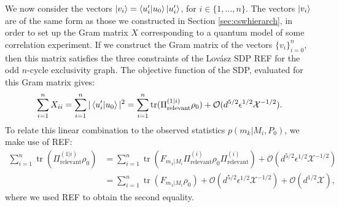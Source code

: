 We now consider the vectors
$\ket{v_i}=\bra{u'_i}\ket{u_0}\ket{u'_i}$,
for $i\in\{1,\dots, n\}$. The vectors $\ket{v_i}$ are of the same form as those we constructed in Section \ref{sec:cswhierarch}, in order to set up the Gram matrix $X$ corresponding to a quantum model of some correlation experiment. If we construct the Gram matrix of the vectors $\{v_i\}_{i=0}^n$, then this matrix satisfies the three constraints of the Lovász SDP REF for the odd $n$-cycle exclusivity graph. The objective function of the SDP, evaluated for this Gram matrix gives:
\begin{equation}
\sum_{i=1}^n X_{ii} = \sum_{i=1}^n \vert \bra{u'_i}\ket{u_0} \vert^2 = \sum_{i=1}^n\operatorname{tr}(\Pi_{\text{relevant}}^{(1\vert i)}\rho_0)+\mathcal{O}(d^{5/2}\epsilon^{1/2}\mathcal{X}^{-1/2}).
\end{equation}
To relate this linear combination to the observed statistics $p(m_k\vert M_i,P_0)$, we make use of REF:
\begin{equation}
\begin{split}
\sum_{i=1}^n\operatorname{tr}(\Pi_{\text{relevant}}^{(1\vert i)}\rho_0) & =\sum_{i=1}^n\operatorname{tr}(F_{m_1\vert M_i}\Pi_{\text{relevant}}^{(i)}\rho_0\Pi_{\text{relevant}}^{(i)})+\mathcal{O}(d^{5/2}\epsilon^{1/2}\mathcal{X}^{-1/2}) \\  & =\sum_{i=1}^n\operatorname{tr}(F_{m_1\vert M_i}\rho_0)+\mathcal{O}(d^{5/2}\epsilon^{1/2}\mathcal{X}^{-1/2})+\mathcal{O}(d^{1/2}\mathcal{X}),
\end{split}
\end{equation}
where we used REF to obtain the second equality.

